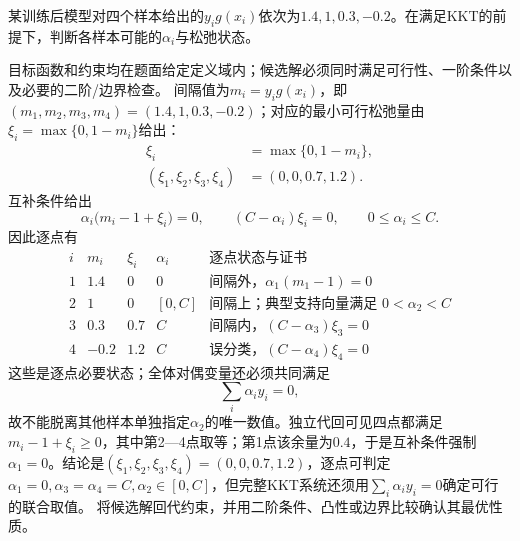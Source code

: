 \label{struct:V3-C02-CH18}
\label{struct:V3-C02-CH32}
\begin{example}[一维软间隔状态判定]\label{exm:V3-C02-kkt-state}
某训练后模型对四个样本给出的$y_ig(x_i)$依次为$1.4,1,0.3,-0.2$。在满足KKT的前提下，判断各样本可能的$\alpha_i$与松弛状态。

\label{struct:V3-C02-CH33}
\end{example}
\begin{solution}
\SolGiven 目标函数和约束均在题面给定定义域内；候选解必须同时满足可行性、一阶条件以及必要的二阶/边界检查。
\SolDerive
间隔值为$m_i=y_i g(x_i)$，即$(m_1,m_2,m_3,m_4)=(1.4,1,0.3,-0.2)$；对应的最小可行松弛量由$\xi_i=\max\{0,1-m_i\}$给出：
\[
\begin{aligned}
\xi_i&=\max\{0,1-m_i\},\\
(\xi_1,\xi_2,\xi_3,\xi_4)&=(0,0,0.7,1.2).
\end{aligned}
\]
互补条件给出
\[
\alpha_i\bigl(m_i-1+\xi_i\bigr)=0,
\qquad (C-\alpha_i)\xi_i=0,
\qquad 0\leq\alpha_i\leq C.
\]
因此逐点有
\[
\begin{array}{c|c|c|c|l}
i&m_i&\xi_i&\alpha_i&\text{逐点状态与证书}\\ \hline
1&1.4&0&0&\text{间隔外，}\alpha_1(m_1-1)=0\\
2&1&0&[0,C]&\text{间隔上；典型支持向量满足 }0<\alpha_2<C\\
3&0.3&0.7&C&\text{间隔内，}(C-\alpha_3)\xi_3=0\\
4&-0.2&1.2&C&\text{误分类，}(C-\alpha_4)\xi_4=0
\end{array}
\]
这些是逐点必要状态；全体对偶变量还必须共同满足
\[
\sum_i\alpha_i y_i=0,
\]
故不能脱离其他样本单独指定$\alpha_2$的唯一数值。独立代回可见四点都满足$m_i-1+\xi_i\ge0$，其中第2—4点取等；第1点该余量为$0.4$，于是互补条件强制$\alpha_1=0$。结论是$(\xi_1,\xi_2,\xi_3,\xi_4)=(0,0,0.7,1.2)$，逐点可判定$\alpha_1=0,\alpha_3=\alpha_4=C,\alpha_2\in[0,C]$，但完整KKT系统还须用$\sum_i\alpha_i y_i=0$确定可行的联合取值。
\SolCheck 将候选解回代约束，并用二阶条件、凸性或边界比较确认其最优性质。
\end{solution}

